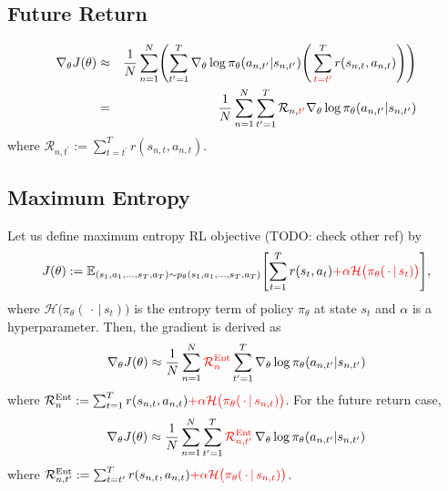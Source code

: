 \documentclass{article}
\begin{document}
\subsection{Future Return}

\begin{eqnarray}
\nabla_\theta J(\theta)
&\approx& \frac{1}{N} \sum_{n=1}^{N} \Biggl( \sum_{t^\prime=1}^{T} \nabla_\theta \log \pi_\theta (a_{n, t^\prime}|s_{n, t^\prime}) \Biggl(\, \sum_{{\color{red}{t=t^\prime}}}^{T} r(s_{n, t}, a_{n, t}) \Biggr) \Biggr)  \\
&=& \frac{1}{N} \sum_{n=1}^{N} \sum_{t^\prime=1}^{T} \mathcal{R}_{n, {\color{red}{t^\prime}}} \nabla_\theta \log \pi_\theta (a_{n, t^\prime}|s_{n, t^\prime})
\end{eqnarray}
where $\mathcal{R}_{n, t^\prime} := \sum_{t=t^\prime}^T r(s_{n, t}, a_{n, t})$.


\subsection{Maximum Entropy}
Let us define maximum entropy RL objective \citep{Haarnoja2017-xl} (TODO: check other ref) by
\begin{eqnarray}
J(\theta) := \mathbb{E}_{(s_1, a_1, \ldots, s_T, a_T) \sim p_\theta(s_1, a_1, \ldots, s_T, a_T)} \Biggl[ \sum_{t=1}^{T} r(s_t, a_t) {\color{red}{ + \alpha \mathcal{H} \bigl(\pi_\theta(\, \cdot \,|\, s_t) \bigr) }}\Biggr],
\end{eqnarray}
where $\mathcal{H} \bigl(\pi_\theta(\, \cdot \,|\, s_t) \bigr)$ is the entropy term of policy $\pi_\theta$ at state $s_t$ and $\alpha$ is a hyperparameter.
Then, the gradient is derived as
\begin{eqnarray}
\nabla_\theta J(\theta)
\approx \frac{1}{N} \sum_{n=1}^{N} {\color{red}{\mathcal{R}_n^{\mathrm{Ent}}}} \sum_{t^\prime=1}^{T} \nabla_\theta \log \pi_\theta (a_{n, t^\prime}|s_{n, t^\prime})
\end{eqnarray}
where $\mathcal{R}_{n}^{\mathrm{Ent}} := \sum_{t=1}^T r(s_{n, t}, a_{n, t}) {\color{red}{ + \alpha \mathcal{H} \bigl(\pi_\theta(\, \cdot \,|\, s_{n, t}) \bigr) }}$.
For the future return case,
\begin{eqnarray}
\nabla_\theta J(\theta)
\approx \frac{1}{N} \sum_{n=1}^{N} \sum_{t^\prime=1}^{T} {\color{red}{\mathcal{R}_{n, t^\prime}^{\mathrm{Ent}}}} \, \nabla_\theta \log \pi_\theta (a_{n, t^\prime}|s_{n, t^\prime})
\end{eqnarray}
where $\mathcal{R}_{n, t^\prime}^{\mathrm{Ent}} := \sum_{t=t^\prime}^T r(s_{n, t}, a_{n, t}) {\color{red}{ + \alpha \mathcal{H} \bigl(\pi_\theta(\, \cdot \,|\, s_{n, t}) \bigr) }}$.
\end{document}
